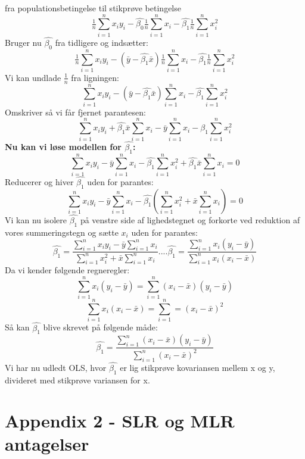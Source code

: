 \documentclass[
  10pt,
]{article}
\begin{document}
fra populationsbetingelse til stikprøve betingelse
\[\tfrac{1}{n}\sum\limits_{i=1}^n x_iy_i-\hat{\beta_0}\tfrac{1}{n}\sum\limits_{i=1}^nx_i-\hat{\beta_1}\tfrac{1}{n}\sum\limits_{i=1}^nx_i^2\]
Bruger nu \(\hat{\beta_0}\) fra tidligere og indsætter:
\[\tfrac{1}{n}\sum\limits_{i=1}^n x_iy_i-(\bar{y}-\hat{\beta_1}\bar{x})\tfrac{1}{n}\sum\limits_{i=1}^nx_i-\hat{\beta_1}\tfrac{1}{n}\sum\limits_{i=1}^nx_i^2\]
Vi kan undlade \(\frac{1}{n}\) fra ligningen:
\[\sum\limits_{i=1}^n x_iy_i-(\bar{y}-\hat{\beta_1}\bar{x})\sum\limits_{i=1}^nx_i-\hat{\beta_1}\sum\limits_{i=1}^nx_i^2\]
Omskriver så vi får fjernet parantesen:
\[\sum\limits_{i=1}^n x_iy_i+\hat{\beta_1}\bar{x}\sum\limits_{i=1}^nx_i-\bar{y}\sum\limits_{i=1}^nx_i-\hat{\beta_1}\sum\limits_{i=1}^nx_i^2\]
\textbf{Nu kan vi løse modellen for $\hat{\beta_1}$:}
\[\sum\limits_{i=1}^nx_iy_i-\bar{y}\sum\limits_{i=1}^n x_i-\hat{\beta_1}\sum\limits_{i=1}^n x_i^2+\hat{\beta_1}\bar{x}\sum\limits_{i=1}^nx_i = 0\]
Reducerer og hiver \(\hat{\beta_1}\) uden for parantes:
\[\sum\limits_{i=1}^nx_iy_i-\bar{y}\sum\limits_{i=1}^n x_i-\hat{\beta_1}(\sum\limits_{i=1}^n x_i^2+\bar{x}\sum\limits_{i=1}^nx_i) = 0\]
Vi kan nu isolere \(\hat{\beta_1}\) på venstre side af lighedstegnet og
forkorte ved reduktion af vores summeringstegn og sætte \(x_i\) uden for
parantes:
\[\hat{\beta_1}= \frac{\sum\limits_{i=1}^nx_iy_i-\bar{y}\sum\limits_{i=1}^n x_i}{\sum\limits_{i=1}^n x_i^2+\bar{x}\sum\limits_{i=1}^nx_i}....\hat{\beta_1}= \frac{\sum\limits_{i=1}^nx_i(y_i-\bar{y})}{\sum\limits_{i=1}^n x_i(x_i-\bar{x})} \]
Da vi kender følgende regneregler:
\[\sum\limits_{i=1}^nx_i(y_i-\bar{y})=\sum\limits_{i=1}^n(x_i-\bar{x})(y_i-\bar{y}) \tag{a}\]
\[\sum\limits_{i=1}^nx_i(x_i-\bar{x})=\sum\limits_{i=1}^n=(x_i-\bar{x})^2 \tag{b} \]
Så kan \(\hat{\beta_1}\) blive skrevet på følgende måde:
\[\hat{\beta_1}= \frac{\sum\limits_{i=1}^n(x_i-\bar{x})(y_i-\bar{y})}{\sum\limits_{i=1}^n(x_i-\bar{x})^2}\]
Vi har nu udledt OLS, hvor \(\hat{\beta_1}\) er lig stikprøve
kovariansen mellem x og y, divideret med stikprøve variansen for x.

\newpage

\section{Appendix 2 - SLR og MLR antagelser}
\label{sec:SLR}
\end{document}
